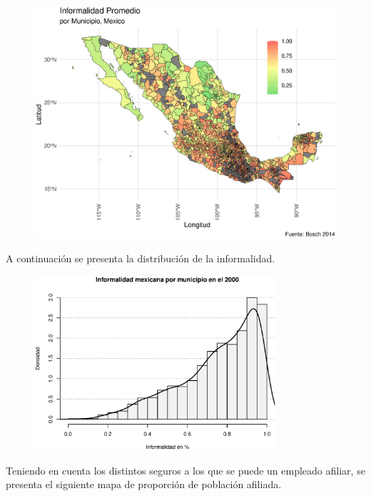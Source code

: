 \documentclass[9pt]{article}
\begin{document}
\begin{figure}[H]
     \centering
     \includegraphics[width=\textwidth]{figs/inf.eps}
 \end{figure}

 A continuaci\'on se presenta la distribuci\'on de la informalidad.
 \begin{figure}[H]
     \centering
     \includegraphics[width=0.8\textwidth]{figs/histinf.eps}
 \end{figure}
 \newpage
 Teniendo en cuenta los distintos seguros a los que se puede un empleado afiliar, se presenta el siguiente mapa de proporci\'on de poblaci\'on afiliada. 
\end{document}
